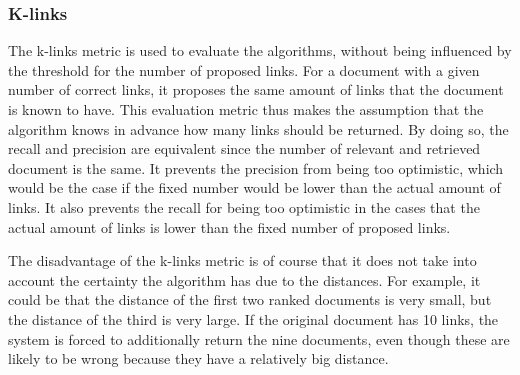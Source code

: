 \subsubsection{K-links}
The k-links metric is used to evaluate the algorithms, without being influenced by the threshold for the number of proposed links. For a document with a given number of correct links, it proposes the same amount of links that the document is known to have. This evaluation metric thus makes the assumption that the algorithm knows in advance how many links should be returned. By doing so, the recall and precision are equivalent since the number of relevant and retrieved document is the same. It prevents the precision from being too optimistic, which would be the case if the fixed number would be lower than the actual amount of links. It also prevents the recall for being too optimistic in the cases that the actual amount of links is lower than the fixed number of proposed links. 

The disadvantage of the k-links metric is of course that it does not take into account the certainty the algorithm has due to the distances. For example, it could be that the distance of the first two ranked documents is very small, but the distance of the third is very large. If the original document has 10 links, the system is forced to additionally return the nine documents, even though these are likely to be wrong because they have a relatively big distance. 

